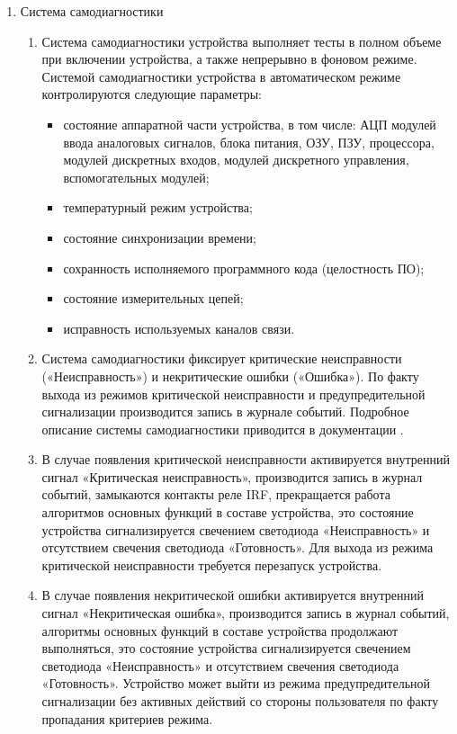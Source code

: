 \begin{enumerate}[label=\arabic{section}.\arabic{subsection}.\arabic*, labelsep=7pt, leftmargin=0pt, itemindent=60pt, align=left]
\item Система самодиагностики
\begin{enumerate}
\item Система самодиагностики устройства выполняет тесты в полном объеме при включении устройства, а также непрерывно в фоновом режиме.
Системой самодиагностики устройства в автоматическом режиме контролируются следующие параметры:
\begin{itemize}
\item состояние аппаратной части устройства, в том числе: АЦП модулей ввода аналоговых сигналов, блока питания, ОЗУ, ПЗУ, процессора, модулей дискретных входов, модулей дискретного управления, вспомогательных модулей;
\item температурный режим устройства;
\item состояние синхронизации времени;
\item сохранность исполняемого программного кода (целостность ПО);
\item состояние измерительных цепей;
\item исправность используемых каналов связи.
\end{itemize}
\item Система самодиагностики фиксирует критические неисправности («Неисправность») и некритические ошибки («Ошибка»).
По факту выхода из режимов критической неисправности и предупредительной сигнализации производится запись в журнале событий.
Подробное описание системы самодиагностики приводится в документации \ManualUnitGeneral.
\item В случае появления критической неисправности активируется внутренний сигнал «Критическая неисправность», производится запись в журнал событий, замыкаются контакты реле IRF, прекращается работа алгоритмов основных функций в составе устройства, это состояние устройства сигнализируется свечением светодиода «Неисправность» и отсутствием свечения светодиода «Готовность».
Для выхода из режима критической неисправности требуется перезапуск устройства.
\item В случае появления некритической ошибки активируется внутренний сигнал «Некритическая ошибка», производится запись в журнал событий, алгоритмы основных функций в составе устройства продолжают выполняться, это состояние устройства сигнализируется свечением светодиода «Неисправность» и отсутствием свечения светодиода «Готовность».
Устройство может выйти из режима предупредительной сигнализации без активных действий со стороны пользователя по факту пропадания критериев режима.
\end{enumerate}


\end{enumerate}
